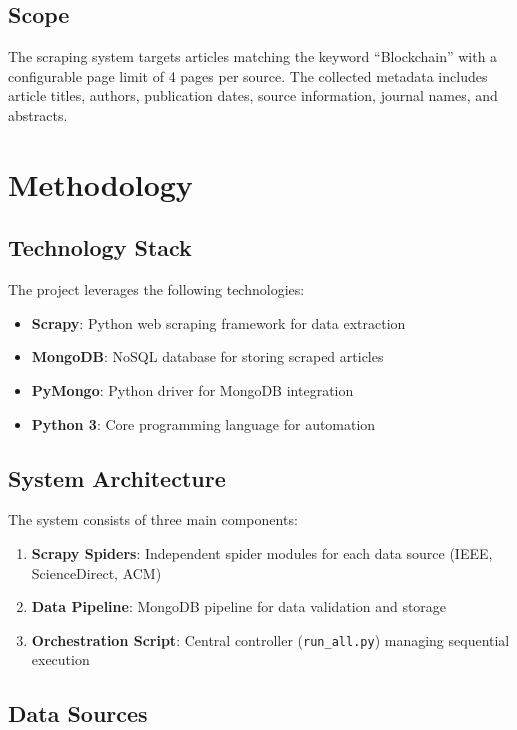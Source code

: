 \documentclass[12pt,a4paper]{article}
\begin{document}
\subsection{Scope}
The scraping system targets articles matching the keyword ``Blockchain'' with a configurable page limit of 4 pages per source. The collected metadata includes article titles, authors, publication dates, source information, journal names, and abstracts.

\section{Methodology}

\subsection{Technology Stack}
The project leverages the following technologies:
\begin{itemize}
    \item \textbf{Scrapy}: Python web scraping framework for data extraction
    \item \textbf{MongoDB}: NoSQL database for storing scraped articles
    \item \textbf{PyMongo}: Python driver for MongoDB integration
    \item \textbf{Python 3}: Core programming language for automation
\end{itemize}

\subsection{System Architecture}
The system consists of three main components:

\begin{enumerate}
    \item \textbf{Scrapy Spiders}: Independent spider modules for each data source (IEEE, ScienceDirect, ACM)
    \item \textbf{Data Pipeline}: MongoDB pipeline for data validation and storage
    \item \textbf{Orchestration Script}: Central controller (\texttt{run\_all.py}) managing sequential execution
\end{enumerate}

\subsection{Data Sources}
\end{document}
